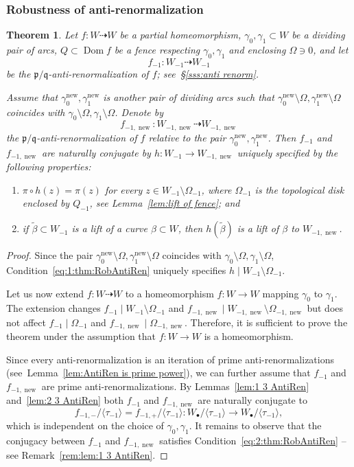 \documentclass[]{amsart}
\newcommand{\Dom}{\operatorname {Dom}}
\newcommand\oseq{{\bullet}}
\newcommand{\pp}{\mathfrak{p}}
\renewcommand{\qq}{\mathfrak{q}}
\newcommand\wall{{Q}}
\newcommand\inn{{\Omega}}
\newcommand\new{{\operatorname{new}}}
\newtheorem{thm}{Theorem}[section]
\theoremstyle{remark}
\numberwithin{equation}{section}
\theoremstyle{definition}
\begin{document}
\subsubsection{Robustness of anti-renormalization}
\begin{thm}
\label{thm:RobAntiRen}
Let $f\colon W\dashrightarrow W$ be a partial homeomorphism, $\gamma_0,\gamma_1\subset W$ be a dividing pair of arcs, $Q\subset \Dom f$ be a fence respecting $\gamma_0,\gamma_1$ and enclosing $\inn\ni 0$, and let \[f_{-1}\colon W_{-1}\dashrightarrow W_{-1}\] be the $\pp/\qq$-anti-renormalization of $f$; see~\S\ref{sss:anti renorm}. 

Assume that $\gamma^\new_0,\gamma^\new_1$ is another pair of dividing arcs such that  ${\gamma^\new_0\setminus \inn},{\gamma^\new_1\setminus \inn}$ coincides with $\gamma_0\setminus \inn,\gamma_1\setminus \inn$. Denote by \[f_{-1,\new}\colon W_{-1,\new }\dashrightarrow W_{-1,\new }\] the $\pp/\qq$-anti-renormalization of $f$ relative to the pair $\gamma^\new_0,\gamma_1^\new$. Then $f_{-1}$ and $f_{-1,\new}$ are naturally conjugate by $h\colon W_{-1}\to W_{-1,\new }$ uniquely specified by the following properties:
\begin{enumerate}
\item $\pi\circ h(z)=\pi(z)$ for every $z\in W_{-1}\setminus\inn_{-1}$, where $\inn_{-1}$ is the topological disk enclosed by $\wall_{-1}$, see Lemma~\ref{lem:lift of  fence}; and\label{eq:1:thm:RobAntiRen}
\item if $\widetilde \beta\subset W_{-1}$ is a lift of a curve $\beta\subset W$, then $h(\widetilde \beta)$ is a lift of $\beta$ to $W_{-1,\new}$.\label{eq:2:thm:RobAntiRen}
\end{enumerate}
\end{thm}
\begin{proof}
Since the pair ${\gamma^\new_0\setminus \inn},{\gamma^\new_1\setminus \inn}$ coincides with $\gamma_0\setminus \inn,\gamma_1\setminus \inn$, Condition~\eqref{eq:1:thm:RobAntiRen} uniquely specifies $h\mid W_{-1}\setminus\inn_{-1}$. 

Let us now extend $f\colon W\dashrightarrow W$ to a homeomorphism $f\colon W\to W$ mapping $\gamma_0$ to $\gamma_1$. The extension changes $f_{-1}\mid W_{-1}\setminus \inn_{-1}$ and $f_{-1, \new}\mid W_{-1,\new }\setminus \inn_{-1,\new }$ but does not affect $f_{-1}\mid  \inn_{-1}$ and $f_{-1, \new}\mid  \inn_{-1,\new }$. Therefore, it is sufficient to prove the theorem under the assumption that $f\colon W\to W$ is a homeomorphism.

Since every anti-renormalization is an iteration of prime anti-renormalizations (see~Lemma~\ref{lem:AntiRen is prime power}), we can further assume that $f_{-1}$ and $f_{-1,\new}$ are prime anti-renormalizations. By Lemmas~\ref{lem:1 3 AntiRen} and~\ref{lem:2 3 AntiRen} both $f_{-1}$ and $f_{-1,\new}$ are naturally conjugate to 
 \[ f_{-1,-}^{}/\langle \tau_{-1} \rangle = f_{-1,+}/\langle \tau_{-1} \rangle\colon W_\oseq /\langle \tau_{-1} \rangle\to W_\oseq /\langle \tau_{-1} \rangle , \] 
 which is independent on the choice of $\gamma_0,\gamma_1$. It remains to observe that the conjugacy between $f_{-1}$ and $f_{-1,\new}$ satisfies Condition~\ref{eq:2:thm:RobAntiRen} -- see Remark~\ref{rem:lem:1 3 AntiRen}. 
\end{proof}
\end{document}
